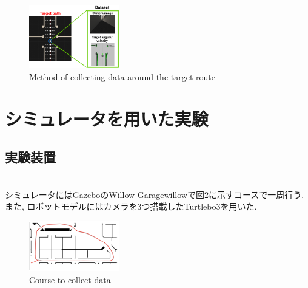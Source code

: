 \documentclass[10pt]{ujarticle}
\begin{document}
    \begin{figure}[h]
        \centering
        \includegraphics[width=0.35\textwidth]{fig/collect-data2.png}
        \caption{Method of collecting data around the target route}
        \label{Fig:collect}
    \end{figure}

    \section{シミュレータを用いた実験}%
    \subsection{実験装置}\mbox{}\\
    シミュレータにはGazebo\cite{gazebo}のWillow Garage{willow}で図\ref{Fig:willow}に示すコースで一周行う. また, ロボットモデルにはカメラを3つ搭載したTurtlebo3\cite{turtlebot3}を用いた. 

    \begin{figure}[!b]
        \centering
        \includegraphics[width=0.35\textwidth]{fig/willow-garage.png}
        \caption{Course to collect data}
        \label{Fig:willow}
    \end{figure}
\end{document}
